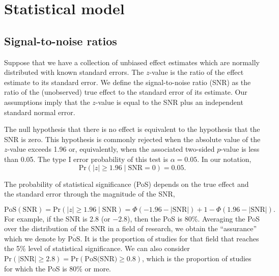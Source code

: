 \documentclass[11pt]{article}
\renewcommand{\Pr}{\mathrm{Pr}}
\begin{document}


\section{Statistical model}

\subsection{Signal-to-noise ratios}
 
Suppose that we have a collection of unbiased effect estimates which are normally distributed with known standard errors. The $z$-value is the ratio of the effect estimate to its standard error. We define the signal-to-noise ratio (SNR) as the ratio of the (unobserved) true effect to the standard error of its estimate. Our assumptions imply that the $z$-value is equal to the SNR plus an independent standard normal error. 

The null hypothesis that there is no effect is equivalent to the hypothesis that the SNR is zero. This hypothesis is commonly rejected when the absolute value of the $z$-value exceeds 1.96 or, equivalently, when the associated two-sided $p$-value is less than 0.05. The type I error probability of this test is $\alpha=0.05$. In our notation, 
$$\Pr(|z| \geq 1.96 \mid \text{SNR}=0)=0.05.$$ 

The probability of statistical significance (PoS) depends on the true effect and the standard error through the magnitude of the SNR,

\begin{equation}
\text{PoS}(\text{SNR})=\Pr(|z| \geq 1.96 \mid \text{SNR}) = \Phi(-1.96 - |\text{SNR}|) + 1 - \Phi(1.96 - |\text{SNR}|). \label{eq:power}
\end{equation}
For example, if the SNR is 2.8 (or $-2.8$), then the PoS is 80\%. Averaging the PoS over the distribution of the SNR in a field of research, we obtain the ``assurance''  which we denote by $\overline{\text{PoS}}$. It is the proportion of studies for that field that reaches the 5\% level of statistical significance.  We can also consider  $\text{Pr}(|\text{SNR}| \geq 2.8) = \text{Pr}(\text{PoS(SNR)} \geq 0.8)$, which is the proportion of studies for which the PoS is 80\% or more.
\end{document}
